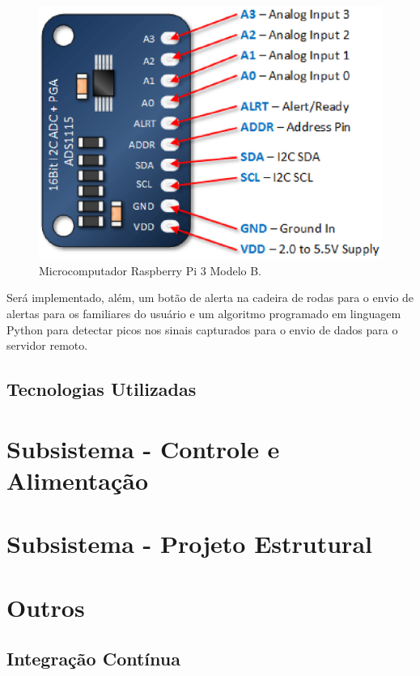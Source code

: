 \begin{figure}[H]
  \centering
    \includegraphics[keepaspectratio=true,scale=0.7]{figuras/ads.eps}
  \caption{Microcomputador Raspberry Pi 3 Modelo B.}
  \label{fig:ads}
\end{figure}

Será implementado, além, um botão de alerta na cadeira de rodas para o envio de alertas 
para os familiares do usuário e um algoritmo programado em linguagem Python para 
detectar picos nos sinais capturados para o envio de dados para o servidor remoto.



\subsection{Tecnologias Utilizadas}

\section{Subsistema - Controle e Alimentação}

\section{Subsistema - Projeto Estrutural}

\section{Outros}

\subsection{Integração Contínua}
